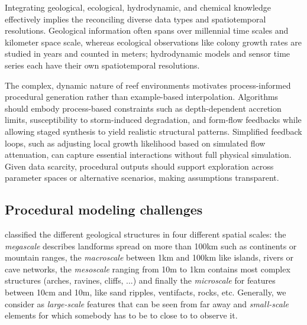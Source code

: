 Integrating geological, ecological, hydrodynamic, and chemical knowledge effectively implies the reconciling diverse data types and spatiotemporal resolutions. Geological information often spans over millennial time scales and kilometer space scale, whereas ecological observations like colony growth rates are studied in years and counted in meters; hydrodynamic models and sensor time series each have their own spatiotemporal resolutions. %

The complex, dynamic nature of reef environments motivates process-informed procedural generation rather than example-based interpolation. Algorithms should embody process-based constraints such as depth-dependent accretion limits, susceptibility to storm-induced degradation, and form-flow feedbacks while allowing staged synthesis to yield realistic structural patterns. Simplified feedback loops, such as adjusting local growth likelihood based on simulated flow attenuation, can capture essential interactions without full physical simulation. Given data scarcity, procedural outputs should support exploration across parameter spaces or alternative scenarios, making assumptions transparent. %



\subsection{Procedural modeling challenges}
\citep{ParisThesis} classified the different geological structures in four different spatial scales: the \textit{megascale} describes landforms spread on more than \si{100}{km} such as continents or mountain ranges, the \textit{macroscale} between \si{1}{km} and \si{100}{km} like islands, rivers or cave networks, the \textit{mesoscale} ranging from \si{10}{m} to \si{1}{km} contains most complex structures (arches, ravines, cliffs, ...) and finally the \textit{microscale} for features between \si{10}{cm} and \si{10}{m}, like sand ripples, ventifacts, rocks, etc. Generally, we consider as \textit{large-scale} features that can be seen from far away and \textit{small-scale} elements for which somebody has to be to close to to observe it.

